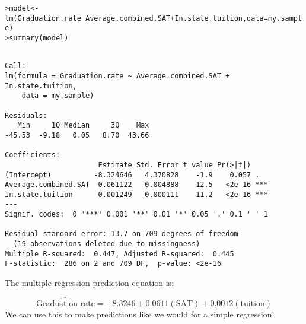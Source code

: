 \documentclass{beamer}\usepackage[]{graphicx}\usepackage[]{color}
\makeatletter
\newcommand{\hlopt}[1]{\textcolor[rgb]{1,0.894,0.769}{#1}}%
\newcommand{\hlstd}[1]{\textcolor[rgb]{1,0.894,0.769}{#1}}%
\newcommand{\hlkwb}[1]{\textcolor[rgb]{0.804,0.776,0.451}{#1}}%
\newcommand{\hlkwc}[1]{\textcolor[rgb]{0.78,0.941,0.545}{#1}}%
\newcommand{\hlkwd}[1]{\textcolor[rgb]{1,0.78,0.769}{#1}}%
\newenvironment{kframe}{%
 \def\at@end@of@kframe{}%
 \ifinner\ifhmode%
  \def\at@end@of@kframe{\end{minipage}}%
  \begin{minipage}{\columnwidth}%
 \fi\fi%
 \def\FrameCommand##1{\hskip\@totalleftmargin \hskip-\fboxsep
 \colorbox{shadecolor}{##1}\hskip-\fboxsep
     \hskip-\linewidth \hskip-\@totalleftmargin \hskip\columnwidth}%
 \MakeFramed {\advance\hsize-\width
   \@totalleftmargin\z@ \linewidth\hsize
   \@setminipage}}%
 {\par\unskip\endMakeFramed%
 \at@end@of@kframe}
\newenvironment{knitrout}{}{} %
\makeatother
\begin{document}
\begin{darkframes}
    \begin{frame}[fragile]
      \fontsize{8}{8}
\begin{knitrout}
\begin{kframe}
\begin{alltt}
\hlstd{> }\hlstd{model} \hlkwb{<-} \hlkwd{lm}\hlstd{(Graduation.rate} \hlopt{~} \hlstd{Average.combined.SAT} \hlopt{+} \hlstd{In.state.tuition,} \hlkwc{data}\hlstd{=my.sample)}
\hlstd{> }\hlkwd{summary}\hlstd{(model)}
\end{alltt}
\begin{verbatim}

Call:
lm(formula = Graduation.rate ~ Average.combined.SAT + In.state.tuition, 
    data = my.sample)

Residuals:
   Min     1Q Median     3Q    Max 
-45.53  -9.18   0.05   8.70  43.66 

Coefficients:
                      Estimate Std. Error t value Pr(>|t|)    
(Intercept)          -8.324646   4.370828    -1.9    0.057 .  
Average.combined.SAT  0.061122   0.004888    12.5   <2e-16 ***
In.state.tuition      0.001249   0.000111    11.2   <2e-16 ***
---
Signif. codes:  0 '***' 0.001 '**' 0.01 '*' 0.05 '.' 0.1 ' ' 1

Residual standard error: 13.7 on 709 degrees of freedom
  (19 observations deleted due to missingness)
Multiple R-squared:  0.447,	Adjusted R-squared:  0.445 
F-statistic:  286 on 2 and 709 DF,  p-value: <2e-16
\end{verbatim}
\end{kframe}
\end{knitrout}
    \end{frame}

    \begin{frame}
      The multiple regression prediction equation is:

      \[
        \widehat{\text{Graduation rate}} =
          -8.3246 +
          0.0611(\text{SAT})
          + 0.0012(\text{tuition})
      \]
      \pause
      We can use this to make predictions like we would for a simple regression!
    \end{frame}

    \begin{frame}[fragile]
\begin{knitrout}


\end{knitrout}
    \end{frame}


\end{darkframes}
\end{document}
